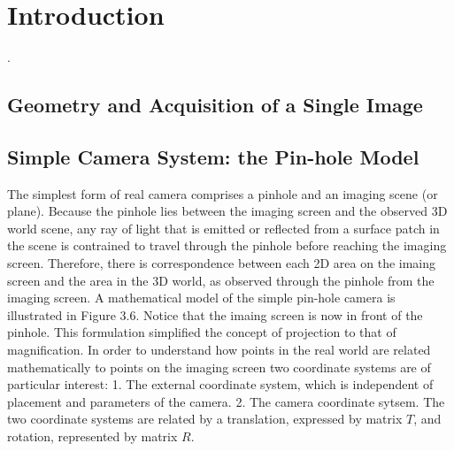 \documentclass[conference]{IEEEtran}
\begin{document}
\title{}

\author{
}

\maketitle

\begin{abstract}
\end{abstract}

\begin{IEEEkeywords}
\end{IEEEkeywords}

\section{Introduction}
\cite{b1}. 

\subsection{Geometry and Acquisition of a Single Image}
\subsection*{Simple Camera System: the Pin-hole Model}
The simplest form of real camera comprises a pinhole and an imaging scene (or plane). Because the pinhole lies between the imaging screen and the observed 3D world scene, any ray of light that is emitted or reflected from a surface patch in the scene is contrained to travel through the pinhole before reaching the imaging screen. Therefore, there is correspondence between each 2D area on the imaing screen and the area in the 3D world, as observed through the pinhole from the imaging screen. A mathematical model of the simple pin-hole camera is illustrated in Figure 3.6. Notice that the imaing screen is now in front of the pinhole. This formulation simplified the concept of projection to that of magnification. In order to understand how points in the real world are related mathematically to points on the imaging screen two coordinate systems are of particular interest: 1. The external coordinate system, which is independent of placement and parameters of the camera. 2. The camera coordinate sytsem. The two coordinate systems are related by a translation, expressed by matrix $T$, and rotation, represented by matrix $R$.
\end{document}
